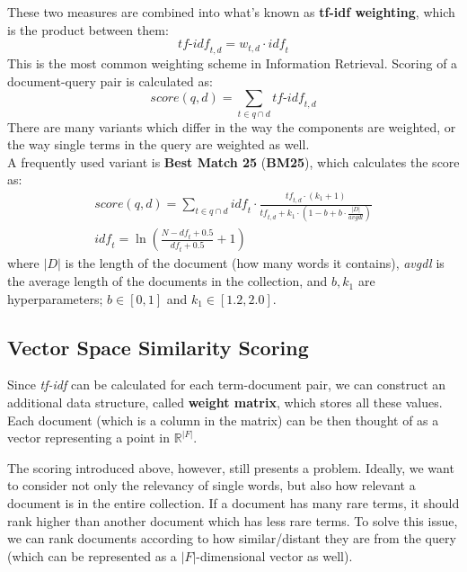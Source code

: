 These two measures are combined into what's known as \textbf{tf-idf weighting}, which is the product between them:
\begin{equation*}
    \textit{tf-idf}_{t,d} = w_{t,d} \cdot \textit{idf}_t
\end{equation*}
This is the most common weighting scheme in Information Retrieval. Scoring of a document-query pair is calculated as:
\begin{equation*}
    \textit{score}(q,d) = \sum_{t \in q \cap d} \textit{tf-idf}_{t,d}
\end{equation*}
There are many variants which differ in the way the components are weighted, or the way single terms in the query are weighted as well. \\
A frequently used variant is \textbf{Best Match 25} (\textbf{BM25}), which calculates the score as:
\begin{gather*}
    \textit{score}(q,d) = \sum_{t \in q \cap d} \textit{idf}_t \cdot \frac{\textit{tf}_{t,d} \cdot (k_1 + 1)}{\textit{tf}_{t,d} + k_1 \cdot (1 - b + b \cdot \frac{|D|}{\textit{avgdl}})} \\
    \textit{idf}_t = \ln \left( \frac{N - \textit{df}_t + 0.5}{\textit{df}_t + 0.5} + 1 \right)
\end{gather*}
where $|D|$ is the length of the document (how many words it contains), \textit{avgdl} is the average length of the documents in the collection, and $b, k_1$ are hyperparameters; $b \in [0,1]$ and $k_1 \in [1.2,2.0]$.

\subsection{Vector Space Similarity Scoring}

Since \textit{tf-idf} can be calculated for each term-document pair, we can construct an additional data structure, called \textbf{weight matrix}, which stores all these values. Each document (which is a column in the matrix) can be then thought of as a vector representing a point in $\mathbb{R}^{|F|}$.

The scoring introduced above, however, still presents a problem. Ideally, we want to consider not only the relevancy of single words, but also how relevant a document is in the entire collection. If a document has many rare terms, it should rank higher than another document which has less rare terms. To solve this issue, we can rank  documents according to how similar/distant they are from the query (which can be represented as a $|F|$-dimensional vector as well).

